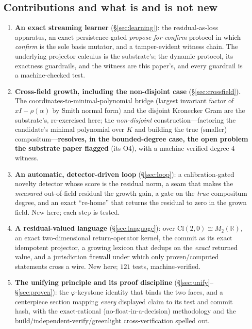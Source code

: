 \documentclass[11pt]{article}
\theoremstyle{plain}
\theoremstyle{definition}
\theoremstyle{remark}
\newcommand{\R}{\mathbb{R}}
\newcommand{\K}{K}
\newcommand{\Cl}{\mathrm{Cl}}
\begin{document}
\subsection*{Contributions and what is and is not new}
\begin{enumerate}[label=(C\arabic*),leftmargin=*]
  \item \textbf{An exact streaming learner} (\S\ref{sec:learning}): the residual-as-loss apparatus, an exact
        persistence-gated \emph{propose-for-confirm} protocol in which \emph{confirm} is the sole basis
        mutator, and a tamper-evident witness chain. The underlying projector calculus is the substrate's;
        the dynamic protocol, its exactness guardrails, and the witness are this paper's, and every guardrail
        is a machine-checked test.
  \item \textbf{Cross-field growth, including the non-disjoint case} (\S\ref{sec:crossfield}). The
        coordinates-to-minimal-polynomial bridge (largest invariant factor of $xI-\rho(\alpha)$ by Smith
        normal form) and the disjoint Kronecker Gram are the substrate's, re-exercised here; the
        \emph{non-disjoint} construction---factoring the candidate's minimal polynomial over $\K$ and building
        the true (smaller) compositum---\textbf{resolves, in the bounded-degree case, the open problem the
        substrate paper flagged} (its O4), with a machine-verified degree-$4$ witness.
  \item \textbf{An automatic, detector-driven loop} (\S\ref{sec:loop}): a calibration-gated novelty detector
        whose score is the residual norm, a seam that makes the \emph{measured} out-of-field residual the
        growth gain, a gate on the \emph{true} compositum degree, and an exact ``re-home'' that returns the
        residual to zero in the grown field. New here; each step is tested.
  \item \textbf{A residual-valued language} (\S\ref{sec:language}): over $\Cl(2,0)\cong M_2(\R)$, an exact
        two-dimensional return-operator kernel, the commit as its exact idempotent projector, a growing
        lexicon that dedups on the \emph{exact} returned value, and a jurisdiction firewall under which only
        proven/computed statements cross a wire. New here; $121$ tests, machine-verified.
  \item \textbf{The unifying principle and its proof discipline} (\S\ref{sec:unify}--\S\ref{sec:proven}): the
        $\varphi$-keystone identity that binds the two faces, and a centerpiece section mapping \emph{every}
        displayed claim to its test and commit hash, with the exact-rational (no-float-in-a-decision)
        methodology and the build/independent-verify/greenlight cross-verification spelled out.
\end{enumerate}
\end{document}
